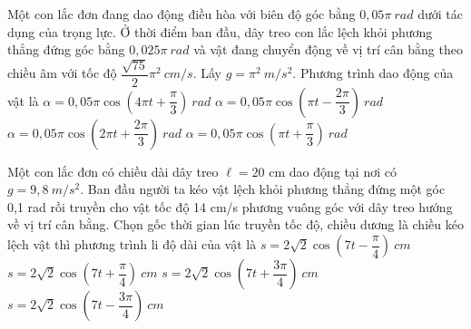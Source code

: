 \begin{ex} %
Một con lắc đơn đang dao động điều hòa với biên độ góc bằng $0,05\pi \ rad$ dưới tác dụng của trọng lực. Ở thời điểm ban đầu, dây treo con lắc lệch khỏi phương thẳng đứng góc bằng $0,025\pi \ rad$ và vật đang chuyển động về vị trí cân bằng theo chiều âm với tốc độ $\dfrac{{\sqrt{75}}}{2}\pi ^2 \ cm/s.$ Lấy $g=\pi ^2\ m/s^2.$ Phương trình dao động của vật là
\choice
{$\alpha =0,05\pi \cos\left(4\pi t+\dfrac{\pi }{3}\right)\ rad$}
{$\alpha =0,05\pi \cos\left(\pi t-\dfrac{2\pi}{3}\right)\ rad$}
{$\alpha =0,05\pi \cos\left(2\pi t+\dfrac{2\pi}{3}\right)\ rad$}
{\True $\alpha =0,05\pi \cos\left(\pi t+\dfrac{\pi }{3}\right)\ rad$}
\end{ex} 
\begin{ex}%
Một con lắc đơn có chiều dài dây treo $\ell  = 20$ cm dao động tại nơi có $g = 9,8\ m/s^2$. Ban đầu người ta kéo vật lệch khỏi phương thẳng đứng một góc 0,1 rad rồi truyền cho vật tốc độ 14 cm/s phương vuông góc với dây treo hướng về vị trí cân bằng. Chọn gốc thời gian lúc truyền tốc độ, chiều dương là chiều kéo lệch vật thì phương trình li độ dài của vật là
\choice
{$s=2\sqrt{2}\cos  \left( 7t-\dfrac{\pi}{4} \right)\ cm$}
{\True $s=2\sqrt{2}\cos  \left( 7t+\dfrac{\pi}{4} \right)\ cm$}
{$s=2\sqrt{2}\cos  \left( 7t+\dfrac{3\pi}{4} \right)\ cm$}
{$s=2\sqrt{2}\cos  \left( 7t-\dfrac{3\pi}{4} \right)\ cm$}
\end{ex} 
